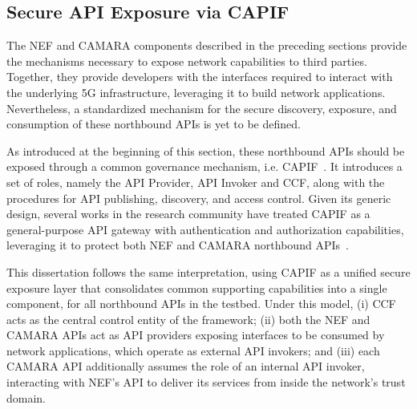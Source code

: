 \subsection{Secure \acs{API} Exposure via \acs{CAPIF}}
\label{chap:proposal:exposure:capif}

The \acs{NEF} and CAMARA components described in the preceding sections provide the mechanisms necessary to expose network capabilities to third parties. Together, they provide developers with the interfaces required to interact with the underlying \acs{5G} infrastructure, leveraging it to build network applications. Nevertheless, a standardized mechanism for the secure discovery, exposure, and consumption of these northbound \acsp{API} is yet to be defined.

As introduced at the beginning of this section, these northbound \acsp{API} should be exposed through a common governance mechanism, i.e. \acs{CAPIF}~\cite{ETSI_CAPIF_TS_123_222_V18_4_0}. It introduces a set of roles, namely the \acs{API} Provider, \acs{API} Invoker and \acf{CCF}, along with the procedures for \acs{API} publishing, discovery, and access control. Given its generic design, several works in the research community have treated \acs{CAPIF} as a general-purpose \acs{API} gateway with authentication and authorization capabilities, leveraging it to protect both \acs{NEF} and CAMARA northbound \acsp{API}~\citep{PathwayNaaSCAMARA,pushingBoundariesScalable5GCN}.

This dissertation follows the same interpretation, using \acs{CAPIF} as a unified secure exposure layer that consolidates common supporting capabilities into a single component, for all northbound \acsp{API} in the testbed. Under this model, (i) \acs{CCF} acts as the central control entity of the framework; (ii) both the \acs{NEF} and CAMARA \acsp{API} act as \acs{API} providers exposing interfaces to be consumed by network applications, which operate as external \acs{API} invokers; and (iii) each CAMARA \acs{API} additionally assumes the role of an internal \acs{API} invoker, interacting with \acs{NEF}'s \acs{API} to deliver its services from inside the network's trust domain.

